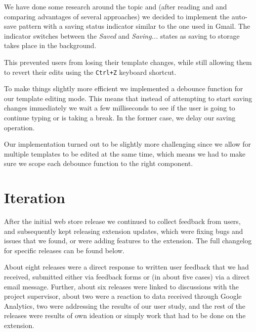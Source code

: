\documentclass[bsc,frontabs,twoside,singlespacing,parskip,deptreport]{infthesis}
\begin{document}
We have done some research around the topic and (after reading \cite{A26} and \cite{A27} and comparing advantages of several approaches) we decided to implement the auto-save pattern with a saving status indicator similar to the one used in Gmail. The indicator switches between the \textit{Saved} and \textit{Saving...} states as saving to storage takes place in the background. 

This prevented users from losing their template changes, while still allowing them to revert their edits using the \texttt{Ctrl+Z} keyboard shortcut.

To make things slightly more efficient we implemented a debounce function \cite{A28} for our template editing mode. This means that instead of attempting to start saving changes immediately we wait a few milliseconds to see if the user is going to continue typing or is taking a break. In the former case, we delay our saving operation.

Our implementation turned out to be slightly more challenging since we allow for multiple templates to be edited at the same time, which means we had to make sure we scope each debounce function to the right component.

\section{Iteration}
After the initial web store release we continued to collect feedback from users, and subsequently kept releasing extension updates, which were fixing bugs and issues that we found, or were adding features to the extension. The full changelog for specific releases can be found below.

About eight releases were a direct response to written user feedback that we had received, submitted either via feedback forms or (in about five cases) via a direct email message. Further, about six releases were linked to discussions with the project supervisor, about two were a reaction to data received through Google Analytics, two were addressing the results of our user study, and the rest of the releases were results of own ideation or simply work that had to be done on the extension.
\end{document}
